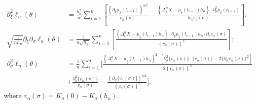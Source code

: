 \documentclass[a4paper,10pt,twoside]{article}
\numberwithin{equation}{section}
\def\D{\Delta}
\def\l{\left}
\def\r{\right}
\def\p{\partial}
\begin{document}
\begin{align*}
\p_\xi^2 \ell_n(\theta) &= \frac{h_n^2 }{n} \sum_{i=1}^n \l[
\frac{ \l\{ \p_\xi \mu_\xi(t_{i-1}) \r\}^{\otimes 2}}{v_n(\sigma)}
- \frac{ \l\{ \D_i^n X - \mu_\xi(t_{i-1}) h_n \r\} \cdot \p_\xi^2 \mu_\xi(t_{i-1})}{h_n v_n(\sigma)}
\r]; \\
\sqrt{\frac{1}{nh_n}} \p_\xi \p_\sigma \ell_n(\theta)&= \frac{1}{n\sqrt{h_n}} \sum_{i=1}^n
\l[
\frac{ \l\{ \D_i^n X - \mu_\xi(t_{i-1}) h_n \r\} \cdot \p_\xi \mu_\xi(t_{i-1}) h_n \cdot \p_\sigma v_n(\sigma) }
{ \l\{ v_n(\sigma)\r\}^2 }
\r]; \\
\p_\sigma^2 \ell_n(\theta) &= \frac{1}{n} \sum_{i=1}^n \Bigg[
\frac{ \l\{ \D_i^n X - \mu_\xi(t_{i-1}) h_n \r\}^2 \cdot \l[ \p_\sigma^2 \{ v_n(\sigma)\} \cdot \{ v_n(\sigma)\} - 2 \{ \p_\sigma v_n(\sigma) \}^2 \r] }
{ 2 \l\{ v_n(\sigma)\r\}^3 } \\
&+ \frac{ \p_\sigma^2 \{ v_n(\sigma)\} }{ v_n(\sigma)} 
- \frac{ \l\{ \p_\sigma \{ v_n(\sigma)\} \r\}^{\otimes 2} }{ \l\{ v_n(\sigma)\r\}^2 }
\Bigg], 
\end{align*}
where $v_n(\sigma) = K_\sigma(0) - K_\sigma(h_n)$. 
\end{document}
